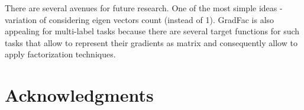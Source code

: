 \documentclass{article}
\begin{document}
There are several avenues for future research. One of the most simple ideas - variation of considering eigen vectors count (instead of 1). GradFac is also appealing for multi-label tasks because there are several target functions for such tasks \cite{Tsoumakas07multi-labelclassification} that allow to represent their gradients as matrix and consequently allow to apply factorization techniques.

\clearpage
\section*{Acknowledgments} 



\nocite{Hastie_theelements}
\nocite{GLM}
\nocite{Friedman98additivelogistic}
\nocite{Friedman00greedyfunction}
\nocite{Zhao_sparseoutput}
\nocite{Allwein00reducingmulticlass}
\nocite{Crammer00onthe}
\nocite{Rifkin04indefense}
\nocite{Lee01algorithmsfor}
\nocite{Koren09matrixfactorization}
\nocite{Hu08collaborativefiltering}
\nocite{Gulin_winningthe}
\nocite{Eckart1936}
\nocite{elasticnet05}
\nocite{Efron1992bootstrap}
\nocite{uciRepo}



\end{document}
